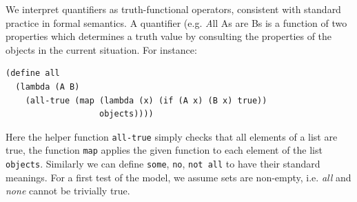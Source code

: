 \documentclass[10pt,letterpaper]{article}
\begin{document}
%



%
%




We interpret quantifiers as truth-functional operators, consistent with standard practice in formal semantics.
A quantifier (e.g. {\emph All As are Bs} is a function of two properties which determines a truth value by consulting the properties of the objects in the current situation. For instance:
\begin{lstlisting}
(define all 
  (lambda (A B) 
    (all-true (map (lambda (x) (if (A x) (B x) true)) 
                   objects))))
\end{lstlisting}
Here the helper function \lstinline{all-true} simply checks that all elements of a list are true, the function \lstinline{map} applies the given function to each element of the list \lstinline{objects}. Similarly we can define \lstinline{some}, \lstinline{no}, \lstinline{not all} to have their standard meanings. For a first test of the model, we assume sets are non-empty, i.e. \emph{all} and \emph{none} cannot be trivially true.
\end{document}
